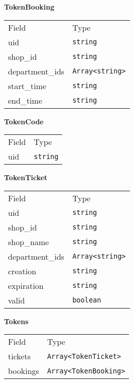     \begin{table}[H]
    \centering
    \textbf{TokenBooking}\\
    \everyrow{\tabucline[0.5pt]-}
    \begin{tabu} to 0.55\textwidth {|X|X|} \hline
    Field & Type \\
    uid & \texttt{string} \\
shop\_id & \texttt{string} \\
department\_ids & \texttt{Array<string>} \\
start\_time & \texttt{string} \\
end\_time & \texttt{string} \\
\end{tabu}
\end{table}


    \begin{table}[H]
    \centering
    \textbf{TokenCode}\\
    \everyrow{\tabucline[0.5pt]-}
    \begin{tabu} to 0.55\textwidth {|X|X|} \hline
    Field & Type \\
    uid & \texttt{string} \\
\end{tabu}
\end{table}


    \begin{table}[H]
    \centering
    \textbf{TokenTicket}\\
    \everyrow{\tabucline[0.5pt]-}
    \begin{tabu} to 0.55\textwidth {|X|X|} \hline
    Field & Type \\
    uid & \texttt{string} \\
shop\_id & \texttt{string} \\
shop\_name & \texttt{string} \\
department\_ids & \texttt{Array<string>} \\
creation & \texttt{string} \\
expiration & \texttt{string} \\
valid & \texttt{boolean} \\
\end{tabu}
\end{table}


    \begin{table}[H]
    \centering
    \textbf{Tokens}\\
    \everyrow{\tabucline[0.5pt]-}
    \begin{tabu} to 0.55\textwidth {|X|X|} \hline
    Field & Type \\
    tickets & \texttt{Array<TokenTicket>} \\
bookings & \texttt{Array<TokenBooking>} \\
\end{tabu}
\end{table}


